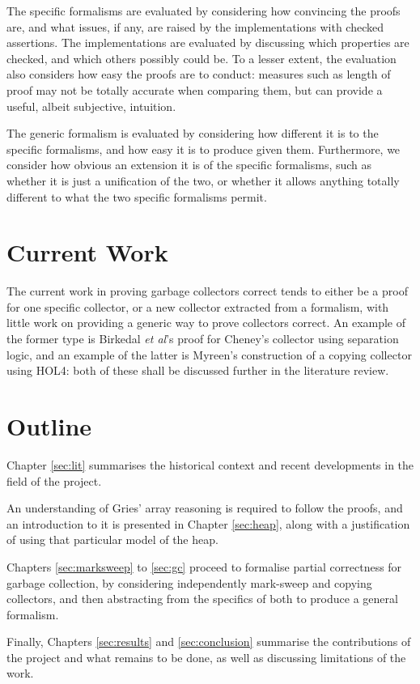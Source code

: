 The specific formalisms are evaluated by considering how convincing
the proofs are, and what issues, if any, are raised by the
implementations with checked assertions. The implementations are
evaluated by discussing which properties are checked, and which others
possibly could be. To a lesser extent, the evaluation also considers
how easy the proofs are to conduct: measures such as length of proof
may not be totally accurate when comparing them, but can provide a
useful, albeit subjective, intuition.

The generic formalism is evaluated by considering how different it is
to the specific formalisms, and how easy it is to produce given
them. Furthermore, we consider how obvious an extension it is of the
specific formalisms, such as whether it is just a unification of the
two, or whether it allows anything totally different to what the two
specific formalisms permit.

\section{Current Work}
\label{sec:intro-current}

The current work in proving garbage collectors correct tends to either
be a proof for one specific collector, or a new collector extracted
from a formalism, with little work on providing a generic way to prove
collectors correct. An example of the former type is Birkedal
\textit{et al}'s\cite{Birkedal04} proof for Cheney's collector using
separation logic, and an example of the latter is
Myreen's\cite{Myreen10} construction of a copying collector using
HOL4: both of these shall be discussed further in the literature
review.
\section{Outline}
\label{sec:intro-outline}

Chapter \ref{sec:lit} summarises the historical context and recent
developments in the field of the project.

An understanding of Gries' array reasoning\cite{Gries87} is required
to follow the proofs, and an introduction to it is presented in
Chapter \ref{sec:heap}, along with a justification of using that
particular model of the heap.

Chapters \ref{sec:marksweep} to \ref{sec:gc} proceed to formalise
partial correctness for garbage collection, by considering
independently mark-sweep and copying collectors, and then abstracting
from the specifics of both to produce a general formalism.

Finally, Chapters \ref{sec:results} and \ref{sec:conclusion} summarise
the contributions of the project and what remains to be done, as well
as discussing limitations of the work.

